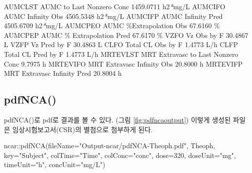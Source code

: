 \documentclass[
  11pt,
  krantz2, a4paper, twoside]{krantz}
\newenvironment{Shaded}{\begin{snugshade}}{\end{snugshade}}
\newcommand{\AttributeTok}[1]{\textcolor[rgb]{0.77,0.63,0.00}{#1}}
\newcommand{\DecValTok}[1]{\textcolor[rgb]{0.00,0.00,0.81}{#1}}
\newcommand{\ExtensionTok}[1]{#1}
\newcommand{\FunctionTok}[1]{\textcolor[rgb]{0.00,0.00,0.00}{#1}}
\newcommand{\NormalTok}[1]{#1}
\newcommand{\PreprocessorTok}[1]{\textcolor[rgb]{0.56,0.35,0.01}{\textit{#1}}}
\newcommand{\SpecialCharTok}[1]{\textcolor[rgb]{0.00,0.00,0.00}{#1}}
\newcommand{\StringTok}[1]{\textcolor[rgb]{0.31,0.60,0.02}{#1}}
\theoremstyle{definition}
\theoremstyle{definition}
\theoremstyle{definition}
\theoremstyle{definition}
\theoremstyle{remark}
\begin{document}
\begin{Shaded}
\begin{Highlighting}[]
\ExtensionTok{AUMCLST}\NormalTok{    AUMC to Last Nonzero Conc                    1459.0711 h2}\PreprocessorTok{*}\NormalTok{mg/L}
\ExtensionTok{AUMCIFO}\NormalTok{    AUMC Infinity Obs                            4505.5348 h2}\PreprocessorTok{*}\NormalTok{mg/L}
\ExtensionTok{AUMCIFP}\NormalTok{    AUMC Infinity Pred                           4505.6709 h2}\PreprocessorTok{*}\NormalTok{mg/L}
\ExtensionTok{AUMCPEO}\NormalTok{    AUMC \%Extrapolation Obs                        67.6160 \%}
\ExtensionTok{AUMCPEP}\NormalTok{    AUMC \% Extrapolation Pred                      67.6170 \%}
\ExtensionTok{VZFO}\NormalTok{       Vz Obs by F                                    30.4867 L}
\ExtensionTok{VZFP}\NormalTok{       Vz Pred by F                                   30.4863 L}
\ExtensionTok{CLFO}\NormalTok{       Total CL Obs by F                               1.4773 L/h}
\ExtensionTok{CLFP}\NormalTok{       Total CL Pred by F                              1.4773 L/h}
\ExtensionTok{MRTEVLST}\NormalTok{   MRT Extravasc to Last Nonzero Conc              9.7975 h}
\ExtensionTok{MRTEVIFO}\NormalTok{   MRT Extravasc Infinity Obs                     20.8000 h}
\ExtensionTok{MRTEVIFP}\NormalTok{   MRT Extravasc Infinity Pred                    20.8004 h}
\end{Highlighting}
\end{Shaded}

\normalsize

\hypertarget{pdfnca}{%
\subsection{pdfNCA()}\label{pdfnca}}

pdfNCA()로 pdf로 결과를 볼 수 있다. (그림 \ref{fig:pdfncaoutput}) 이렇게 생성된 파일은 임상시험보고서(CSR)의 별첨으로 첨부하게 된다.

\begin{Shaded}
\begin{Highlighting}[]
\NormalTok{ncar}\SpecialCharTok{::}\FunctionTok{pdfNCA}\NormalTok{(}\AttributeTok{fileName=}\StringTok{"Output{-}ncar/pdfNCA{-}Theoph.pdf"}\NormalTok{, Theoph, }\AttributeTok{key=}\StringTok{"Subject"}\NormalTok{, }
             \AttributeTok{colTime=}\StringTok{"Time"}\NormalTok{,  }\AttributeTok{colConc=}\StringTok{"conc"}\NormalTok{, }\AttributeTok{dose=}\DecValTok{320}\NormalTok{, }\AttributeTok{doseUnit=}\StringTok{"mg"}\NormalTok{, }
             \AttributeTok{timeUnit=}\StringTok{"h"}\NormalTok{, }\AttributeTok{concUnit=}\StringTok{"mg/L"}\NormalTok{)}
\end{Highlighting}
\end{Shaded}
\end{document}
